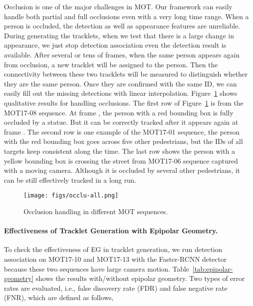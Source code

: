 \documentclass[10pt,twocolumn,letterpaper]{article}
\begin{document}
Occlusion is one of the major challenges in MOT. Our framework can easily handle both partial and full occlusions even with a very long time range. 
When a person is occluded, the detection as well as appearance features are unreliable. 
During generating the tracklets, when we test that there is a large change in appearance, we just stop detection association even the detection result is available. After several 
or tens of frames, when the same person appears again from occlusion, a new tracklet will be assigned to the person. Then the connectivity between these two tracklets will be measured to distinguish whether they are the same person. Once they are confirmed with the same ID, we can easily fill out the missing detections with linear interpolation. Figure~\ref{fig:occlusion} shows qualitative results for handling occlusions. The first row of Figure~\ref{fig:occlusion} is from the MOT17-08 sequence. At frame , the person with a red bounding box is fully occluded by a statue. But it can be correctly tracked after it appears again at frame . The second row is one example of the MOT17-01 sequence, the person with the red bounding box goes across five other pedestrians, but the IDs of all targets keep consistent along the time. The last row shows the person with a yellow bounding box is crossing the street from MOT17-06 sequence captured with a moving camera. Although it is occluded by several other pedestrians, it can be still effectively tracked in a long run.

\begin{figure}
\begin{center}
\texttt{[image: figs/occlu-all.png]}
\end{center}
    \caption{Occlusion handling in different MOT sequences. }
\label{fig:occlusion}
\end{figure}

\paragraph{Effectiveness of Tracklet Generation with Epipolar Geometry.}

To check the effectiveness of EG in tracklet generation, we run detection association on MOT17-10 and MOT17-13 with the Faster-RCNN detector because these two sequences have large camera motion. Table~\ref{tab:epipolar-geometry} shows the results with/without epipolar geometry. Two types of error rates are evaluated, i.e., false discovery rate (FDR) and false negative rate (FNR), which are defined as follows, 
\end{document}
